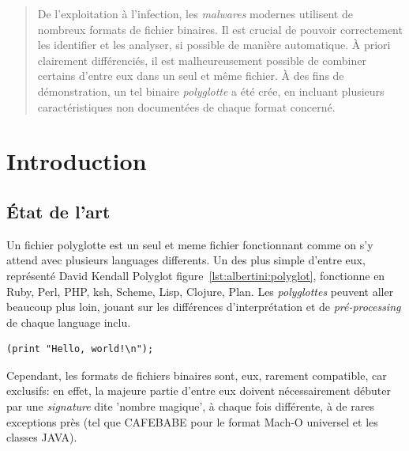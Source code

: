 



\maketitle
{}

\begin{abstract}
	De l'exploitation à l'infection, les {\it malwares} modernes utilisent de nombreux formats de fichier binaires.
        Il est crucial de pouvoir correctement les identifier et les analyser, si possible de manière automatique.
        À priori clairement différenciés, il est malheureusement possible de combiner certains d'entre eux dans un seul et même fichier.
        À des fins de démonstration, un tel binaire {\it polyglotte} a été crée, en incluant plusieurs caractéristiques non documentées de chaque format concerné.
\end{abstract}


\section{Introduction}

\subsection{État de l'art}

Un fichier polyglotte est un seul et meme fichier fonctionnant comme on s'y attend avec plusieurs languages differents.  Un des plus simple d'entre eux, représenté David Kendall Polyglot figure~\ref{lst:albertini:polyglot}, fonctionne en Ruby, Perl, PHP, ksh, Scheme, Lisp, Clojure, Plan. Les {\it polyglottes} peuvent aller beaucoup plus loin, jouant sur les différences d'interprétation et de {\it pré-processing} de chaque language inclu.

\begin{lstlisting}[language={},caption={un programme polyglotte simple},label={lst:albertini:polyglot}]
 (print "Hello, world!\n");
\end{lstlisting}
Cependant, les formats de fichiers binaires sont, eux, rarement compatible, car exclusifs: en effet, la majeure partie d'entre eux doivent nécessairement débuter par une {\it signature} dite 'nombre magique', à chaque fois différente, à de rares exceptions près (tel que CAFEBABE pour le format Mach-O universel et les classes JAVA).

